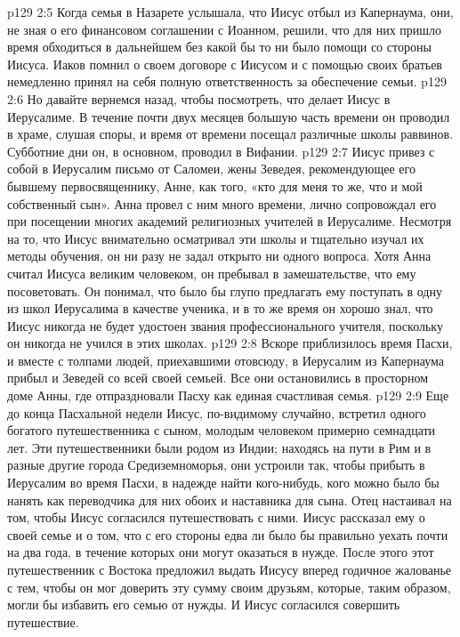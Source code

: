 \vs p129 2:5 \pc Когда семья в Назарете услышала, что Иисус отбыл из Капернаума, они, не зная о его финансовом соглашении с Иоанном, решили, что для них пришло время обходиться в дальнейшем без какой бы то ни было помощи со стороны Иисуса. Иаков помнил о своем договоре с Иисусом и с помощью своих братьев немедленно принял на себя полную ответственность за обеспечение семьи.
\vs p129 2:6 \pc Но давайте вернемся назад, чтобы посмотреть, что делает Иисус в Иерусалиме. В течение почти двух месяцев большую часть времени он проводил в храме, слушая споры, и время от времени посещал различные школы раввинов. Субботние дни он, в основном, проводил в Вифании.
\vs p129 2:7 Иисус привез с собой в Иерусалим письмо от Саломеи, жены Зеведея, рекомендующее его бывшему первосвященнику, Анне, как того, «кто для меня то же, что и мой собственный сын». Анна провел с ним много времени, лично сопровождал его при посещении многих академий религиозных учителей в Иерусалиме. Несмотря на то, что Иисус внимательно осматривал эти школы и тщательно изучал их методы обучения, он ни разу не задал открыто ни одного вопроса. Хотя Анна считал Иисуса великим человеком, он пребывал в замешательстве, что ему посоветовать. Он понимал, что было бы глупо предлагать ему поступать в одну из школ Иерусалима в качестве ученика, и в то же время он хорошо знал, что Иисус никогда не будет удостоен звания профессионального учителя, поскольку он никогда не учился в этих школах.
\vs p129 2:8 Вскоре приблизилось время Пасхи, и вместе с толпами людей, приехавшими отовсюду, в Иерусалим из Капернаума прибыл и Зеведей со всей своей семьей. Все они остановились в просторном доме Анны, где отпраздновали Пасху как единая счастливая семья.
\vs p129 2:9 \pc Еще до конца Пасхальной недели Иисус, по\hyp{}видимому случайно, встретил одного богатого путешественника с сыном, молодым человеком примерно семнадцати лет. Эти путешественники были родом из Индии; находясь на пути в Рим и в разные другие города Средиземноморья, они устроили так, чтобы прибыть в Иерусалим во время Пасхи, в надежде найти кого\hyp{}нибудь, кого можно было бы нанять как переводчика для них обоих и наставника для сына. Отец настаивал на том, чтобы Иисус согласился путешествовать с ними. Иисус рассказал ему о своей семье и о том, что с его стороны едва ли было бы правильно уехать почти на два года, в течение которых они могут оказаться в нужде. После этого этот путешественник с Востока предложил выдать Иисусу вперед годичное жалованье с тем, чтобы он мог доверить эту сумму своим друзьям, которые, таким образом, могли бы избавить его семью от нужды. И Иисус согласился совершить путешествие.
